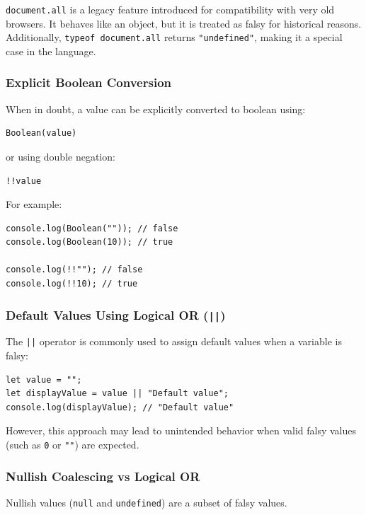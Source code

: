 \documentclass{scrbook}
\begin{document}
\texttt{document.all} is a legacy feature introduced for compatibility with very old browsers. It behaves like an object, but it is treated as falsy for historical reasons. Additionally, \texttt{typeof document.all} returns \texttt{"undefined"}, making it a special case in the language.

\subsubsection*{Explicit Boolean Conversion}

When in doubt, a value can be explicitly converted to boolean using:

\begin{lstlisting}
Boolean(value)
\end{lstlisting}

or using double negation:

\begin{lstlisting}
!!value
\end{lstlisting}

For example:

\begin{lstlisting}
console.log(Boolean("")); // false
console.log(Boolean(10)); // true

console.log(!!""); // false
console.log(!!10); // true
\end{lstlisting}

\subsubsection{Default Values Using Logical OR (\texttt{||})}

The \texttt{||} operator is commonly used to assign default values when a variable is falsy:

\begin{lstlisting}
let value = "";
let displayValue = value || "Default value";
console.log(displayValue); // "Default value"
\end{lstlisting}

However, this approach may lead to unintended behavior when valid falsy values (such as \texttt{0} or \texttt{""}) are expected.

\subsubsection{Nullish Coalescing vs Logical OR}

Nullish values (\texttt{null} and \texttt{undefined}) are a subset of falsy values.
\end{document}
